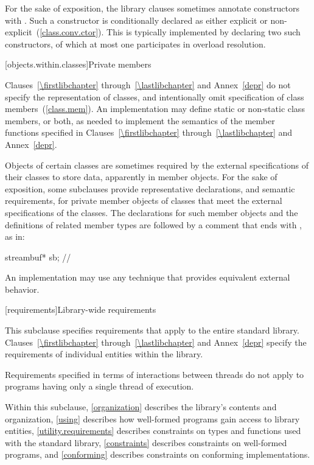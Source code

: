 \pnum
For the sake of exposition, the library clauses sometimes annotate
constructors with \EXPLICIT{}. Such a constructor is conditionally declared
as either explicit or non-explicit~(\ref{class.conv.ctor}).
\enternote This is typically implemented by declaring two such constructors,
of which at most one participates in overload resolution. \exitnote

[objects.within.classes]{Private members}

\pnum
Clauses~\ref{\firstlibchapter} through~\ref{\lastlibchapter} and
Annex~\ref{depr} do not specify the representation of classes, and intentionally
omit specification of class members~(\ref{class.mem}). An implementation may
define static or non-static class members, or both, as needed to implement the
semantics of the member functions specified in Clauses~\ref{\firstlibchapter}
through~\ref{\lastlibchapter} and Annex~\ref{depr}.

\pnum
Objects of certain classes are sometimes required by the external specifications of
their classes to store data, apparently in member objects. For the sake of exposition,
some subclauses provide representative declarations, and semantic requirements, for
private member objects of classes that meet the external specifications of the classes.
The declarations for such member objects and the definitions of related member types are
followed by a comment that ends with \expos, as in:

\begin{codeblock}
streambuf* sb;  // \expos
\end{codeblock}

\pnum
An implementation may use any technique that provides equivalent external behavior.

[requirements]{Library-wide requirements}

\pnum
This subclause specifies requirements that apply to the entire \Cpp standard library.
Clauses~\ref{\firstlibchapter} through~\ref{\lastlibchapter} and Annex~\ref{depr}
specify the requirements of individual entities within the library.

\pnum
Requirements specified in terms of interactions between threads do not apply to
programs having only a single thread of execution.

\pnum
Within this subclause, \ref{organization} describes the library's contents and
organization, \ref{using} describes how well-formed \Cpp programs gain access to library
entities,
\ref{utility.requirements} describes constraints on types and functions used with
the \Cpp standard library,
\ref{constraints} describes constraints on well-formed \Cpp programs, and
\ref{conforming} describes constraints on conforming implementations.

